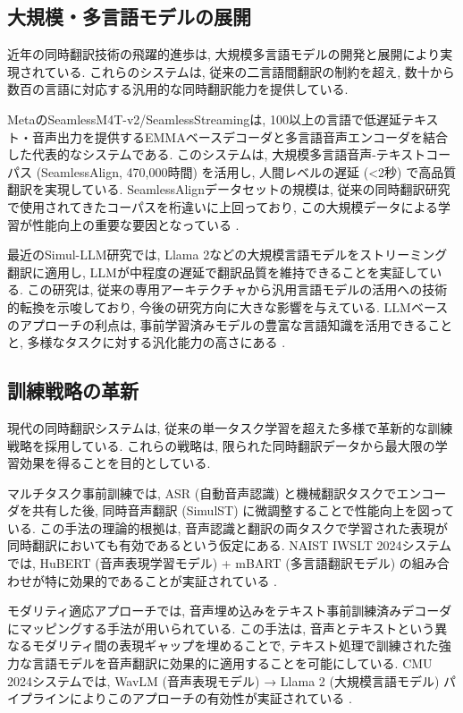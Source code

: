\subsection{大規模・多言語モデルの展開}

近年の同時翻訳技術の飛躍的進歩は, 大規模多言語モデルの開発と展開により実現されている.
これらのシステムは, 従来の二言語間翻訳の制約を超え, 数十から数百の言語に対応する汎用的な同時翻訳能力を提供している.

MetaのSeamlessM4T-v2/SeamlessStreamingは, 100以上の言語で低遅延テキスト・音声出力を提供するEMMAベースデコーダと多言語音声エンコーダを結合した代表的なシステムである.
このシステムは, 大規模多言語音声-テキストコーパス (SeamlessAlign, 470,000時間) を活用し, 人間レベルの遅延 (<2秒) で高品質翻訳を実現している.
SeamlessAlignデータセットの規模は, 従来の同時翻訳研究で使用されてきたコーパスを桁違いに上回っており, この大規模データによる学習が性能向上の重要な要因となっている \cite{barrault2023seamlessm4t}.

最近のSimul-LLM研究では, Llama 2などの大規模言語モデルをストリーミング翻訳に適用し, LLMが中程度の遅延で翻訳品質を維持できることを実証している.
この研究は, 従来の専用アーキテクチャから汎用言語モデルの活用への技術的転換を示唆しており, 今後の研究方向に大きな影響を与えている.
LLMベースのアプローチの利点は, 事前学習済みモデルの豊富な言語知識を活用できることと, 多様なタスクに対する汎化能力の高さにある \cite{agostinelli2024simulllm}.

\subsection{訓練戦略の革新}

現代の同時翻訳システムは, 従来の単一タスク学習を超えた多様で革新的な訓練戦略を採用している.
これらの戦略は, 限られた同時翻訳データから最大限の学習効果を得ることを目的としている.

マルチタスク事前訓練では, ASR (自動音声認識) と機械翻訳タスクでエンコーダを共有した後, 同時音声翻訳 (SimulST) に微調整することで性能向上を図っている.
この手法の理論的根拠は, 音声認識と翻訳の両タスクで学習された表現が同時翻訳においても有効であるという仮定にある.
NAIST IWSLT 2024システムでは, HuBERT (音声表現学習モデル) + mBART (多言語翻訳モデル) の組み合わせが特に効果的であることが実証されている \cite{ko2024naist}.

モダリティ適応アプローチでは, 音声埋め込みをテキスト事前訓練済みデコーダにマッピングする手法が用いられている.
この手法は, 音声とテキストという異なるモダリティ間の表現ギャップを埋めることで, テキスト処理で訓練された強力な言語モデルを音声翻訳に効果的に適用することを可能にしている.
CMU 2024システムでは, WavLM (音声表現モデル) → Llama 2 (大規模言語モデル) パイプラインによりこのアプローチの有効性が実証されている \cite{xu2024cmu}.

